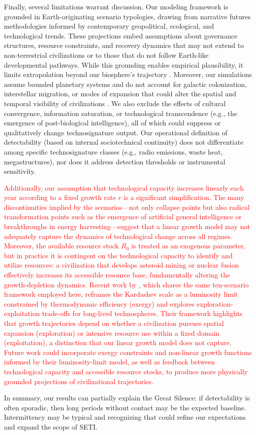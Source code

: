 Finally, several limitations warrant discussion. Our modeling framework is grounded in Earth-originating scenario typologies, drawing from narrative futures methodologies informed by contemporary geopolitical, ecological, and technological trends. These projections embed assumptions about governance structures, resource constraints, and recovery dynamics that may not extend to non-terrestrial civilizations or to those that do not follow Earth-like developmental pathways. While this grounding enables empirical plausibility, it limits extrapolation beyond our biosphere's trajectory \citep{Rubin2001-sk,Denning2011-fj}. Moreover, our simulations assume bounded planetary systems and do not account for galactic colonization, interstellar migration, or modes of expansion that could alter the spatial and temporal visibility of civilizations \citep{Walters1980-ev,Papagiannis1983-xv}. We also exclude the effects of cultural convergence, information saturation, or technological transcendence (e.g., the emergence of post-biological intelligence), all of which could suppress or qualitatively change technosignature output. Our operational definition of detectability (based on internal sociotechnical continuity) does not differentiate among specific technosignature classes (e.g., radio emissions, waste heat, megastructures), nor does it address detection thresholds or instrumental sensitivity.

\textcolor{red}{Additionally, our assumption that technological capacity increases linearly each year according to a fixed growth rate $r$ is a significant simplification. The many discontinuities implied by the scenarios---not only collapse points but also radical transformation points such as the emergence of artificial general intelligence or breakthroughs in energy harvesting---suggest that a linear growth model may not adequately capture the dynamics of technological change across all regimes. Moreover, the available resource stock $R_0$ is treated as an exogenous parameter, but in practice it is contingent on the technological capacity to identify and utilize resources: a civilization that develops asteroid mining or nuclear fusion effectively increases its accessible resource base, fundamentally altering the growth-depletion dynamics. Recent work by \citet{Haqq-Misra2025-lum}, which shares the same ten-scenario framework employed here, reframes the Kardashev scale as a luminosity limit constrained by thermodynamic efficiency (exergy) and explores exploration-exploitation trade-offs for long-lived technospheres. Their framework highlights that growth trajectories depend on whether a civilization pursues spatial expansion (exploration) or intensive resource use within a fixed domain (exploitation), a distinction that our linear growth model does not capture. Future work could incorporate exergy constraints and non-linear growth functions informed by their luminosity-limit model, as well as feedback between technological capacity and accessible resource stocks, to produce more physically grounded projections of civilizational trajectories.}

In summary, our results can partially explain the Great Silence: if detectability is often sporadic, then long periods without contact may be the expected baseline. Intermittency may be typical and recognizing that could refine our expectations and expand the scope of SETI.
